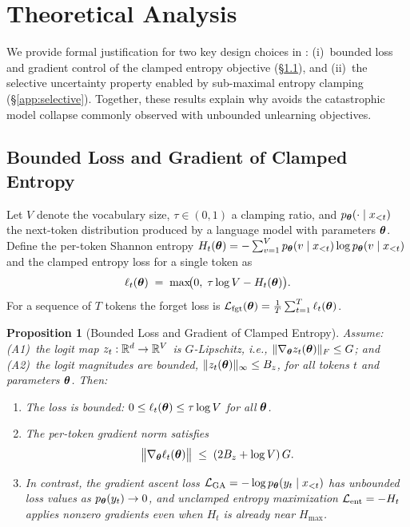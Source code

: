 \section{Theoretical Analysis}
\label{app:theory}

We provide formal justification for two key design choices in \method:
(i)~bounded loss and gradient control of the clamped entropy objective (\S\ref{app:bounded_grad}), and
(ii)~the selective uncertainty property enabled by sub-maximal entropy clamping (\S\ref{app:selective}).
Together, these results explain why \method avoids the catastrophic model collapse commonly observed with unbounded unlearning objectives.


\subsection{Bounded Loss and Gradient of Clamped Entropy}
\label{app:bounded_grad}

Let $V$ denote the vocabulary size, $\tau \in (0,1)$ a clamping ratio, and $p_{\boldsymbol{\theta}}(\cdot \mid x_{<t})$ the next-token distribution produced by a language model with parameters $\boldsymbol{\theta}$.
Define the per-token Shannon entropy $H_t(\boldsymbol{\theta}) = -\sum_{v=1}^{V} p_{\boldsymbol{\theta}}(v \mid x_{<t}) \log p_{\boldsymbol{\theta}}(v \mid x_{<t})$ and the clamped entropy loss for a single token as
\begin{equation}
\label{eq:clamp_token}
\ell_t(\boldsymbol{\theta}) \;=\; \max\!\bigl(0,\;\tau \log V - H_t(\boldsymbol{\theta})\bigr).
\end{equation}
For a sequence of $T$ tokens the forget loss is $\mathcal{L}_{\mathrm{fgt}}(\boldsymbol{\theta}) = \frac{1}{T}\sum_{t=1}^{T} \ell_t(\boldsymbol{\theta})$.

\medskip
\noindent\textbf{Proposition 1} (Bounded Loss and Gradient of Clamped Entropy).
\textit{Assume:
(A1)~the logit map $z_t : \mathbb{R}^d \to \mathbb{R}^V$ is $G$-Lipschitz, i.e., $\lVert \nabla_{\boldsymbol{\theta}} z_t(\boldsymbol{\theta}) \rVert_F \leq G$; and
(A2)~the logit magnitudes are bounded, $\lVert z_t(\boldsymbol{\theta}) \rVert_\infty \leq B_z$, for all tokens $t$ and parameters $\boldsymbol{\theta}$.
Then:}

\begin{enumerate}
\item[(a)] \textit{The loss is bounded: $0 \leq \ell_t(\boldsymbol{\theta}) \leq \tau \log V$ for all $\boldsymbol{\theta}$.}
\item[(b)] \textit{The per-token gradient norm satisfies}
\begin{equation}
\label{eq:grad_bound}
\bigl\lVert \nabla_{\boldsymbol{\theta}} \ell_t(\boldsymbol{\theta}) \bigr\rVert \;\leq\; (2B_z + \log V)\, G.
\end{equation}
\item[(c)] \textit{In contrast, the gradient ascent loss $\mathcal{L}_\mathrm{GA} = -\log p_{\boldsymbol{\theta}}(y_t \mid x_{<t})$ has unbounded loss values as $p_{\boldsymbol{\theta}}(y_t) \to 0$, and unclamped entropy maximization $\mathcal{L}_\mathrm{ent} = -H_t$ applies nonzero gradients even when $H_t$ is already near $H_\mathrm{max}$.}
\end{enumerate}

